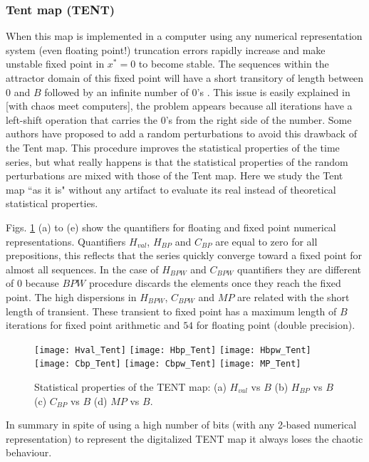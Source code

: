 \subsubsection{Tent map (TENT)} \label{sssec:tent}

When this map is implemented in a computer using any numerical representation system (even floating point!) truncation errors rapidly increase and make unstable fixed point in $x^*=0$ to become stable.
The sequences within the attractor domain of this fixed point will have a short transitory of length between $0$ and $B$ followed by an infinite number of  $0$'s \cite{Jessa2002,Callegari}.
This issue is easily explained in [with chaos meet computers], the problem appears because all iterations have a left-shift operation that carries the $0$'s from the right side of the number.
Some authors \cite{buscar} have proposed to add a random perturbations to avoid this drawback of the Tent map.
This procedure improves the statistical properties of the time series, but what really happens is that the statistical properties of the random perturbations are mixed with those of the Tent map.
Here we study the Tent map ``as it is" without any artifact to evaluate its real instead of theoretical statistical properties. 

Figs. \ref{fig:TENT_QuantiB} (a) to (e) show the quantifiers for floating and fixed point numerical representations.
Quantifiers $H_{val}$, $H_{BP}$ and $C_{BP}$ are equal to zero for all prepositions, this reflects that the series quickly converge toward a fixed point for almost all sequences.
In the case of $H_{BPW}$ and $C_{BPW}$ quantifiers they are different of $0$ because $BPW$ procedure discards the elements once they reach the fixed point.
The high dispersions in $H_{BPW}$, $C_{BPW}$ and $MP$ are related with the short length of transient.
These transient to fixed point has a maximum length of $B$ iterations for fixed point arithmetic and $54$ for floating point (double precision).

\begin{figure}
	\texttt{[image: Hval\_Tent]}
	\texttt{[image: Hbp\_Tent]}
	\texttt{[image: Hbpw\_Tent]}
	\texttt{[image: Cbp\_Tent]}
	\texttt{[image: Cbpw\_Tent]}
	\texttt{[image: MP\_Tent]}
	\caption{Statistical properties of the TENT map: (a) $H_{val}$ vs $B$ (b) $H_{BP}$ vs $B$ (c) $C_{BP}$ vs $B$ (d) $MP$ vs $B$.}
	\label{fig:TENT_QuantiB}
\end{figure}

In summary in spite of using a high number of bits (with any 2-based numerical representation) to represent the digitalized TENT map it always loses the chaotic behaviour.
